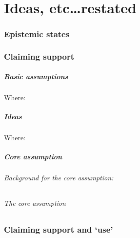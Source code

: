 \chapter{Ideas, etc\dots restated}
\label{cha:restatable}

\subsection{Epistemic states}


\subsection{Claiming support}

\paragraph{Basic assumptions}

\assuCSVP*

\assuCSRR*

\assuIndicate*

Where:


\paragraph{Ideas}

\iCSA*

Where:


\ideaEIS*

\paragraph{Core assumption}

\subparagraph{Background for the core assumption: }

\ideaRequisite*






\subparagraph{The core assumption}

\assuCSRReq*


\subsection{Claiming support and `use'}
\label{sec:claiming-support-use}

